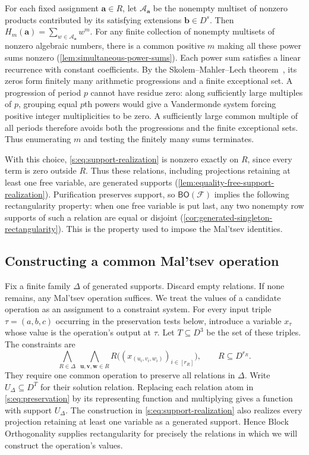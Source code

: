 \documentclass[11pt,letterpaper,onecolumn]{article}
\theoremstyle{plain}
\theoremstyle{definition}
\theoremstyle{remark}
\newcommand{\cF}{\mathcal F}
\newcommand{\BO}{\mathsf{BO}}
\begin{document}
For each fixed assignment $\mathbf a\in R$, let $\mathcal A_{\mathbf a}$
be the nonempty multiset of nonzero products contributed by its
satisfying extensions $\mathbf b\in D^s$. Then
$H_m(\mathbf a)=\sum_{w\in\mathcal A_{\mathbf a}}w^m$.
For any finite collection of nonempty multisets of nonzero algebraic
numbers, there is a common positive $m$ making all these power sums
nonzero (\cref{lem:simultaneous-power-sums}).
Each power sum satisfies a linear recurrence with constant coefficients.
By the Skolem--Mahler--Lech theorem~\cite{Lech1953}, its zeros form finitely
many arithmetic progressions and a finite exceptional set. A progression
of period $p$ cannot have residue zero: along sufficiently large multiples
of $p$, grouping equal $p$th powers would give a Vandermonde system
forcing positive integer multiplicities to be zero. A sufficiently large
common multiple of all periods therefore avoids both the progressions
and the finite exceptional sets. Thus enumerating $m$ and testing the
finitely many sums terminates.

With this choice, \eqref{s:eq:support-realization} is nonzero exactly
on $R$, since every term is zero outside $R$. Thus these relations,
including projections retaining at least one free variable, are
generated supports (\cref{lem:equality-free-support-realization}).
Purification preserves support, so $\BO(\cF)$ implies the following
rectangularity property: when one free variable is put last, any two
nonempty row supports of such a relation are equal or disjoint
(\cref{cor:generated-singleton-rectangularity}). This is the property
used to impose the Mal'tsev identities.

\subsection{Constructing a common Mal'tsev operation}

Fix a finite family $\Delta$ of generated supports. Discard empty
relations. If none remains, any Mal'tsev operation suffices.
We treat the values of a candidate operation as an assignment to a
constraint system. For every input triple $\tau=(a,b,c)$ occurring in
the preservation tests below, introduce a variable $x_\tau$ whose
value is the operation's output at $\tau$. Let $T\subseteq D^3$ be
the set of these triples. The constraints are
\begin{equation}
 \bigwedge_{R\in\Delta}\ \bigwedge_{\mathbf u,\mathbf v,\mathbf w\in R}
 R\bigl((x_{(u_i,v_i,w_i)})_{i\in[r_R]}\bigr),
 \qquad R\subseteq D^{r_R}.
 \label{s:eq:preservation}
\end{equation}
They require one common operation to preserve all relations in $\Delta$.
Write $U_\Delta\subseteq D^T$ for their solution relation. Replacing
each relation atom in \eqref{s:eq:preservation} by its representing
function and multiplying gives a function with support $U_\Delta$.
The construction in \eqref{s:eq:support-realization} also realizes
every projection retaining at least one variable as a generated support.
Hence Block Orthogonality supplies rectangularity for precisely the
relations in which we will construct the operation's values.
\end{document}
